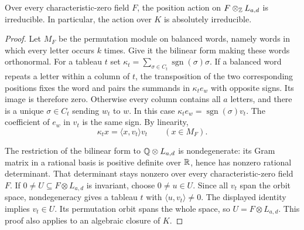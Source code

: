 \begin{lemma}
\label{lem:rectangular-specht-irreducible}
\leanok
Over every characteristic-zero field $F$, the position action on
$F\otimes_\mathbb Z L_{a,d}$ is irreducible. In particular, the action over $K$
is absolutely irreducible.
\end{lemma}
\begin{proof}
Let $M_F$ be the permutation module on balanced words, namely words in
which every letter occurs $k$ times. Give it the bilinear form making
these words orthonormal. For a tableau $t$ set
$\kappa_t=\sum_{\sigma\in C_t}\operatorname{sgn}(\sigma)\sigma$.
If a balanced word repeats a letter within a column of $t$, the
transposition of the two corresponding positions fixes the word and
pairs the summands in $\kappa_t e_w$ with opposite signs. Its image is
therefore zero. Otherwise every column contains all $a$ letters, and
there is a unique $\sigma\in C_t$ sending $w_t$ to $w$. In this case
$\kappa_t e_w=\operatorname{sgn}(\sigma)v_t$. The coefficient of $e_w$
in $v_t$ is the same sign. By linearity,
\[
 \kappa_t x=\langle x,v_t\rangle v_t\qquad(x\in M_F).
\]

The restriction of the bilinear form to $\mathbb Q\otimes L_{a,d}$ is
nondegenerate: its Gram matrix in a rational basis is positive definite
over $\mathbb R$, hence has nonzero rational determinant. That determinant stays
nonzero over every characteristic-zero field $F$.
If $0\ne U\subseteq F\otimes L_{a,d}$ is invariant, choose $0\ne u\in U$.
Since all $v_t$ span the orbit space, nondegeneracy gives a tableau $t$
with $\langle u,v_t\rangle\ne0$. The displayed identity implies $v_t\in U$.
Its permutation orbit spans the whole space, so $U=F\otimes L_{a,d}$.
This proof also applies to an algebraic closure of $K$.
\end{proof}

